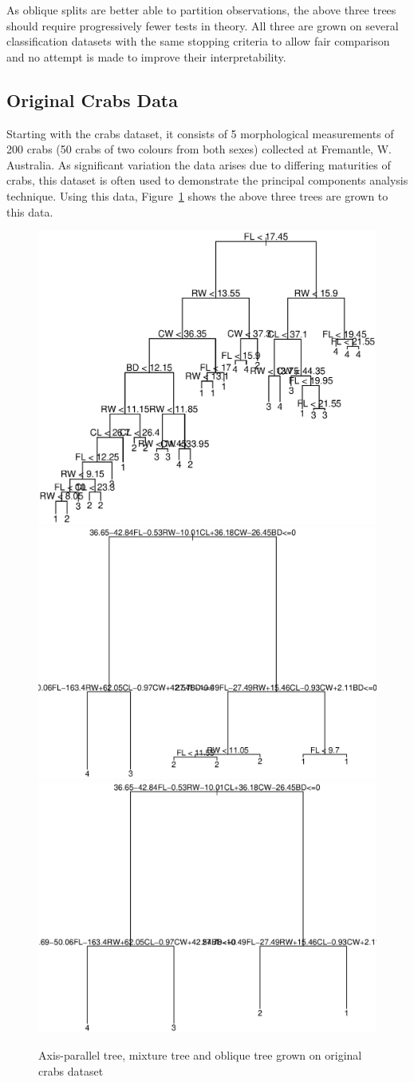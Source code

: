 As oblique splits are better able to partition observations, the above three trees should require progressively fewer tests in theory. All three are grown on several classification datasets with the same stopping criteria to allow fair comparison and no attempt is made to improve their interpretability.

\subsection{Original Crabs Data}
\label{OriginalCrabsData}
Starting with the crabs dataset, it consists of 5 morphological measurements of 200 crabs (50 crabs of two colours from both sexes) collected at Fremantle, W. Australia. As significant variation the data arises due to differing maturities of crabs, this dataset is often used to demonstrate the principal components analysis technique. Using this data, Figure~\ref{fig:oblique_splits_crabs_original} shows the above three trees are grown to this data. \\

\begin{figure}
\centering
\includegraphics[width=.32\textwidth]{oblique_splits_crabs_original_off_tree.ps}
\includegraphics[width=.32\textwidth]{oblique_splits_crabs_original_on_tree.ps}
\includegraphics[width=.32\textwidth]{oblique_splits_crabs_original_only_tree.ps}
\caption{Axis-parallel tree, mixture tree and oblique tree grown on original crabs dataset}
\label{fig:oblique_splits_crabs_original}
\end{figure}

